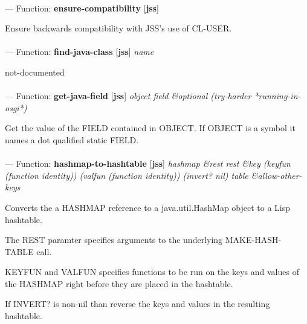 \paragraph{}
\label{JSS:ENSURE-COMPATIBILITY}
--- Function: \textbf{ensure-compatibility} [\textbf{jss}] \textit{}

\begin{adjustwidth}{5em}{5em}
Ensure backwards compatibility with JSS's use of CL-USER.
\end{adjustwidth}

\paragraph{}
\label{JSS:FIND-JAVA-CLASS}
--- Function: \textbf{find-java-class} [\textbf{jss}] \textit{name}

\begin{adjustwidth}{5em}{5em}
not-documented
\end{adjustwidth}

\paragraph{}
\label{JSS:GET-JAVA-FIELD}
--- Function: \textbf{get-java-field} [\textbf{jss}] \textit{object field \&optional (try-harder *running-in-osgi*)}

\begin{adjustwidth}{5em}{5em}
Get the value of the FIELD contained in OBJECT.
If OBJECT is a symbol it names a dot qualified static FIELD.
\end{adjustwidth}

\paragraph{}
\label{JSS:HASHMAP-TO-HASHTABLE}
--- Function: \textbf{hashmap-to-hashtable} [\textbf{jss}] \textit{hashmap \&rest rest \&key (keyfun (function identity)) (valfun (function identity)) (invert? nil) table \&allow-other-keys}

\begin{adjustwidth}{5em}{5em}
Converts the a HASHMAP reference to a java.util.HashMap object to a Lisp hashtable.

The REST paramter specifies arguments to the underlying MAKE-HASH-TABLE call.

KEYFUN and VALFUN specifies functions to be run on the keys and values
of the HASHMAP right before they are placed in the hashtable.

If INVERT? is non-nil than reverse the keys and values in the resulting hashtable.
\end{adjustwidth}

